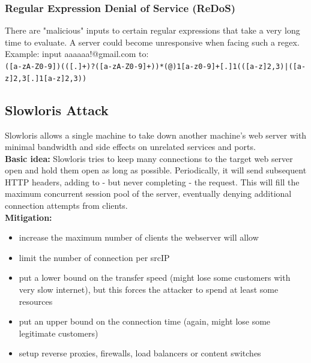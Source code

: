 \documentclass[11pt,oneside,a4paper]{article}
\begin{document}
\subsubsection{Regular Expression Denial of Service (ReDoS)}

There are "malicious" inputs to certain regular expressions that take a very long time to evaluate. A server could become unresponsive when facing such a regex.\\
Example: input aaaaaa!@gmail.com to:\\
\texttt{([a-zA-Z0-9])(([\-.]+)?([a-zA-Z0-9]+))*(@){1}[a-z0-9]+[.]{1}(([a-z]{2,3})|([a-z]{2,3}[.]{1}[a-z]{2,3}))}

\subsection{Slowloris Attack}

Slowloris allows a single machine to take down another machine's web server with minimal bandwidth and side effects on unrelated services and ports.\\
\textbf{Basic idea:} Slowloris tries to keep many connections to the target web server open and hold them open as long as possible. Periodically, it will send subsequent HTTP headers, adding to - but never completing - the request. This will fill the maximum concurrent session pool of the server, eventually denying additional connection attempts from clients.\\

\noindent \textbf{Mitigation:}

\vspace{-\topsep}
\begin{itemize}
	\setlength{\itemsep}{0pt}
	\setlength{\parskip}{0pt}
	\item increase the maximum number of clients the webserver will allow
	\item limit the number of connection per srcIP
	\item put a lower bound on the transfer speed (might lose some customers with very slow internet), but this forces the attacker to spend at least some resources
	\item put an upper bound on the connection time (again, might lose some legitimate customers)
	\item setup reverse proxies, firewalls, load balancers or content switches
\end{itemize}
\vspace{-\topsep}
\end{document}
